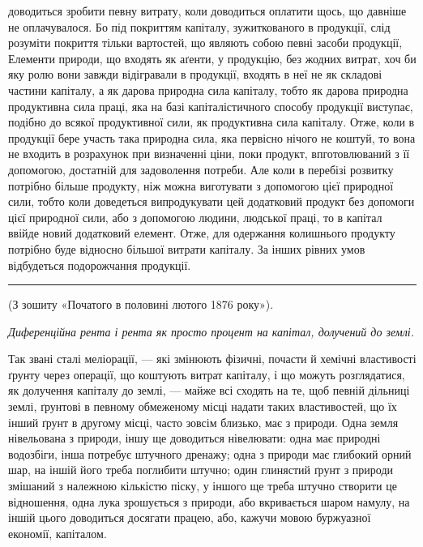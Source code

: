 \parcont{}  %
доводиться зробити певну витрату, коли доводиться оплатити щось, що давніше
не оплачувалося. Бо під покриттям капіталу, зужиткованого в продукції, слід
розуміти покриття тільки вартостей, що являють собою певні засоби продукції,
Елементи природи, що входять як аґенти, у продукцію, без жодних витрат,
хоч би яку ролю вони завжди відігравали в продукції, входять в неї не як складові
частини капіталу, а як дарова природна сила капіталу, тобто як дарова природна
продуктивна сила праці, яка на базі капіталістичного способу продукції
виступає, подібно до всякої продуктивної сили, як продуктивна сила капіталу.
Отже, коли в продукції бере участь така природна сила, яка первісно
нічого не коштуй, то вона не входить в розрахунок при визначенні ціни, поки
продукт, впготовлюваний з її допомогою, достатній для задоволення потреби.
Але коли в перебізі розвитку потрібно більше продукту, ніж можна виготувати
з допомогою цієї природної сили, тобто коли доведеться випродукувати
цей додатковий продукт без допомоги цієї природної сили, або з допомогою
людини, людської праці, то в капітал ввійде новий додатковий елемент. Отже,
для одержання колишнього продукту потрібно буде відносно більшої витрати
капіталу. За інших рівних умов відбудеться подорожчання продукції.

\pfbreak

(З зошиту «Початого в половині лютого 1876 року»).

\noindent{}\emph{Диференційна рента і рента як просто процент на капітал,
долучений до землі.}

\noindent{}Так звані сталі меліорації, — які змінюють фізичні, почасти й хемічні
властивості ґрунту через операції, що коштують витрат капіталу, і що можуть
розглядатися, як долучення капіталу до землі, — майже всі сходять на те,
щоб певній дільниці землі, ґрунтові в певному обмеженому місці надати таких
властивостей, що їх інший ґрунт в другому місці, часто зовсім близько, має
з природи. Одна земля нівельована з природи, іншу ще доводиться нівелювати:
одна має природні водозбіги, інша потребує штучного дренажу; одна з природи
має глибокий орний шар, на іншій його треба поглибити штучно; один глинястий
ґрунт з природи змішаний з належною кількістю піску, у іншого ще
треба штучно створити це відношення, одна лука зрошується з природи, або
вкривається шаром намулу, на іншій цього доводиться досягати працею, або,
кажучи мовою буржуазної економії, капіталом.


